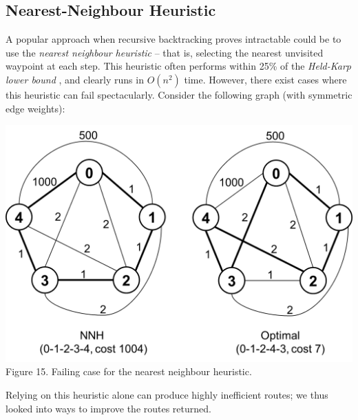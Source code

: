 \documentclass[a4paper, 10pt]{report}
\begin{document}
\subsection{Nearest-Neighbour Heuristic}
A popular approach when recursive backtracking proves intractable could be to use the \textit{nearest neighbour heuristic} -- that is, selecting the nearest unvisited waypoint at each step. This heuristic often performs within 25\% of the \textit{Held-Karp lower bound} \cite{nnh}, and clearly runs in $O(n^2)$ time. However, there exist cases where this heuristic can fail spectacularly. Consider the following graph (with symmetric edge weights):
\begin{center}
\includegraphics[scale=0.4]{nnh_fail.png}\\
Figure 15. Failing case for the nearest neighbour heuristic.
\end{center}
Relying on this heuristic alone can produce highly inefficient routes; we thus looked into ways to improve the routes returned.
\end{document}

